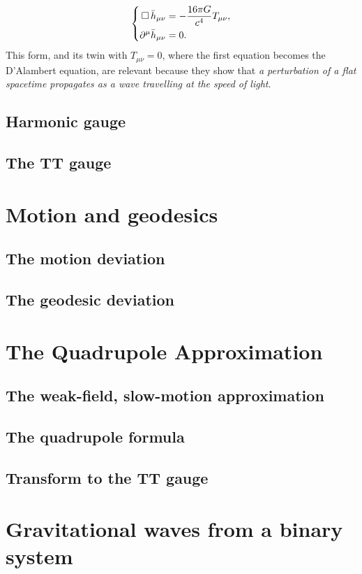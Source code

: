 \[
    \left\{
\begin{aligned}
    \Box\, \bar{h}_{\mu\nu} &= -\frac{16\pi G}{c^4} T_{\mu\nu}, 
    \notag\\
    \partial^\mu \bar{h}_{\mu\nu} &= 0.
\end{aligned}
\right.
\]
This form, and its twin with $T_{\mu\nu}=0$, where the first equation becomes the D'Alambert equation, are relevant because they show that \textit{a perturbation of a flat spacetime propagates as a wave travelling at the speed of light}.


\subsection{Harmonic gauge}
\subsection{The TT gauge}


\section{Motion and geodesics}
\subsection{The motion deviation}
\subsection{The geodesic deviation}

\section{The Quadrupole Approximation}
\subsection{The weak-field, slow-motion approximation}
\subsection{The quadrupole formula}
\subsection{Transform to the TT gauge}

\section{Gravitational waves from a binary system}
